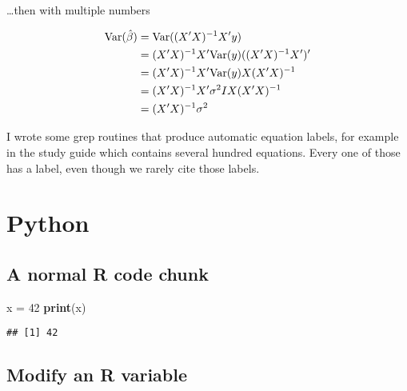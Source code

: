 \documentclass[
]{book}
\newenvironment{Shaded}{\begin{snugshade}}{\end{snugshade}}
\newcommand{\DataTypeTok}[1]{\textcolor[rgb]{0.13,0.29,0.53}{#1}}
\newcommand{\DecValTok}[1]{\textcolor[rgb]{0.00,0.00,0.81}{#1}}
\newcommand{\KeywordTok}[1]{\textcolor[rgb]{0.13,0.29,0.53}{\textbf{#1}}}
\newcommand{\NormalTok}[1]{#1}
\newcommand{\OperatorTok}[1]{\textcolor[rgb]{0.81,0.36,0.00}{\textbf{#1}}}
\newcommand{\OtherTok}[1]{\textcolor[rgb]{0.56,0.35,0.01}{#1}}
\newcommand{\StringTok}[1]{\textcolor[rgb]{0.31,0.60,0.02}{#1}}
\begin{document}
\ldots then with multiple numbers

\begin{align}
\mathrm{Var}(\hat{\beta}) & =\mathrm{Var}((X'X)^{-1}X'y) \notag \\
 & =(X'X)^{-1}X'\mathrm{Var}(y)((X'X)^{-1}X')'\label{eq:var-a}\\ 
 & =(X'X)^{-1}X'\mathrm{Var}(y)X(X'X)^{-1}\label{eq:var-b}\\ 
 & =(X'X)^{-1}X'\sigma^{2}IX(X'X)^{-1}\label{eq:var-c}\\ 
 & =(X'X)^{-1}\sigma^{2} \label{eq:var-d}
\end{align}

I wrote some grep routines that produce automatic equation labels, for example in the study guide which contains several hundred equations. Every one of those has a label, even though we rarely cite those labels.

\hypertarget{python}{%
\chapter{Python}\label{python}}

\hypertarget{a-normal-r-code-chunk}{%
\section{A normal R code chunk}\label{a-normal-r-code-chunk}}

\begin{Shaded}
\end{Shaded}

\begin{Shaded}
\begin{Highlighting}[]
\NormalTok{x =}\StringTok{ }\DecValTok{42}
\KeywordTok{print}\NormalTok{(x)}
\end{Highlighting}
\end{Shaded}

\begin{verbatim}
## [1] 42
\end{verbatim}

\hypertarget{modify-an-r-variable}{%
\section{Modify an R variable}\label{modify-an-r-variable}}
\end{document}
